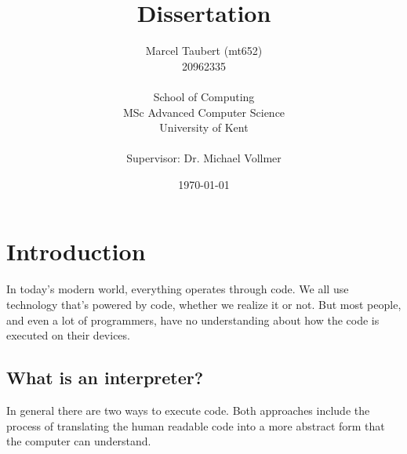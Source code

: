 \documentclass{article}
\title{Dissertation}
\author{
    Marcel Taubert  (mt652)\\
    20962335        \\
    \\
    School of Computing \\
    MSc Advanced Computer Science\\
    University of Kent \\
    \\
    Supervisor: Dr. Michael Vollmer
}
\date{\today}
\begin{document}
\maketitle
\clearpage
\tableofcontents
\section{Introduction}



In today's modern world, everything operates through code. We all use
technology that's powered by code, whether we realize it or not. But most
people, and even a lot of programmers, have no understanding about how the code
is executed on their devices.

\subsection{What is an interpreter?}
In general there are two ways to execute code. Both approaches include the
process of translating the human readable code into a more abstract form that
the computer can understand. 
\end{document}
